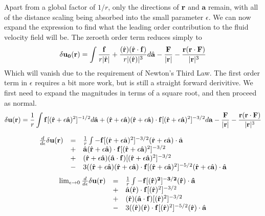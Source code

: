 \documentclass[11pt]{ucthesis}
\def\br{{\bf r}}
\def\ba{\mathbf{a}}
\begin{document}
Apart from a global factor of $1/r$, only the directions of $\br$ and $ \mathbf{a}$ remain, with all of the distance scaling being absorbed into the small parameter $\epsilon$. We can now expand the expression to find what the leading order contribution to the fluid velocity field will be.
The zeroeth order term reduces simply to
\begin{equation}
\label{eq:forcedensityzeroth}
\delta \mathbf{u_0}(\br) = \int \frac{\bf f}{r|\hat{\br}|} + \frac{(\hat{\br}) (\hat{\br} \cdot \mathbf{f})}{r|(\hat{\br})|^3} d\hat{\ba} - \frac{\bf F}{|\br|} - \frac{\br (\br \cdot \bf F)}{|\br|^3}
\end{equation}
Which will vanish due to the requirement of Newton's Third Law.
The first order term in $\epsilon$ requires a bit more work, but is still a straight forward derivitive. We first need to expand the magnitudes in terms of a square root, and then proceed as normal.
\begin{equation}
\label{eq:forcedensityfirst}
\delta \mathbf{u}(\br) = \frac{1}{r} \int  \mathbf{f}[(\hat{\br} + \epsilon\hat{\ba})^2]^{-1/2} d\hat{\ba} +(\hat{\br} + \epsilon\hat{\ba})(\hat{\br} + \epsilon\hat{\ba})\cdot \mathbf{f} [(\hat{\br} + \epsilon\hat{\ba})^2]^{-3/2} d\ba - \frac{\bf F}{|\br|} - \frac{\br (\br \cdot \mathbf{F})}{|\br|^3}
\end{equation}

\begin{equation}
\begin{array}{rcl}
\label{eq:forcedensityfirstderiv}
\frac{d}{d\epsilon} \delta \mathbf{u}(\br) &=& \frac{1}{r} \int 
-\mathbf{f} [(\hat{\br} + \epsilon\hat{\ba})^2]^{-3/2} (\hat{\br} + \epsilon\hat{\ba})\cdot \hat{\ba} \\
&+&\hat{\ba}(\hat{\br} + \epsilon\hat{\ba})\cdot \mathbf{f} [(\hat{\br} + \epsilon\hat{\ba})^2]^{-3/2} \\
&+& (\hat{\br} + \epsilon\hat{\ba})(\hat{\ba}\cdot\mathbf{f})[(\hat{\br} + \epsilon\hat{\ba})^2]^{-3/2}\\
&-& 3 ((\hat{\br} + \epsilon\hat{\ba})(\hat{\br} + \epsilon\hat{\ba})\cdot\mathbf{f} [(\hat{\br} + \epsilon\hat{\ba})^2]^{-5/2} (\hat{\br} + \epsilon\hat{\ba})\cdot \hat{\ba}
\end{array}
\end{equation}
\begin{equation}
\begin{array}{rcl}
\label{eq:forcedensitylimit}
\lim_{\epsilon\to 0} \frac{d}{d\epsilon} \delta \mathbf{u}(\br) &=& \frac{1}{r} \int 
-\bf f [(\hat{\br})^2]^{-3/2} (\hat{\br})\cdot \hat{\ba} \\
&+&\hat{\ba}(\hat{\br})\cdot \mathbf{f} [(\hat{\br})^2]^{-3/2} \\
&+& (\hat{\br})(\hat{\ba}\cdot\mathbf{f})[(\hat{\br})^2]^{-3/2} \\
&-& 3 ((\hat{\br})(\hat{\br})\cdot\mathbf{f} [(\hat{\br})^2]^{-5/2} (\hat{\br})\cdot \hat{\ba}
\end{array}
\end{equation}
\end{document}

